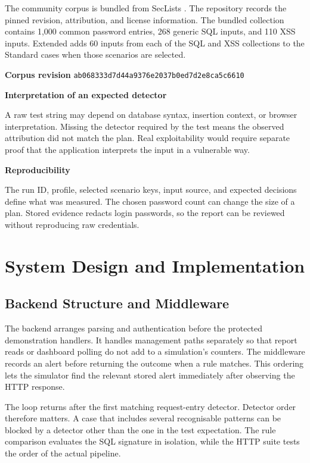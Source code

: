 \documentclass[11pt,a4paper,oneside]{report}
\newcommand{\topic}[1]{\smallskip\noindent\textbf{#1}\par\nobreak\vspace{-.39em}}
\begin{document}
The community corpus is bundled from SecLists \cite{seclists}. The repository records the pinned revision, attribution, and license information. The bundled collection contains 1,000 common password entries, 268 generic SQL inputs, and 110 XSS inputs. Extended adds 60 inputs from each of the SQL and XSS collections to the Standard cases when those scenarios are selected.

\textbf{Corpus revision} \texttt{ab068333d7d44a9376e2037b0ed7d2e8ca5c6610}

\topic{Interpretation of an expected detector}
A raw test string may depend on database syntax, insertion context, or browser interpretation. Missing the detector required by the test means the observed attribution did not match the plan. Real exploitability would require separate proof that the application interprets the input in a vulnerable way.

\topic{Reproducibility}
The run ID, profile, selected scenario keys, input source, and expected decisions define what was measured. The chosen password count can change the size of a plan. Stored evidence redacts login passwords, so the report can be reviewed without reproducing raw credentials.

\chapter{System Design and Implementation}
\section{Backend Structure and Middleware}
The backend arranges parsing and authentication before the protected demonstration handlers. It handles management paths separately so that report reads or dashboard polling do not add to a simulation's counters. The middleware records an alert before returning the outcome when a rule matches. This ordering lets the simulator find the relevant stored alert immediately after observing the HTTP response.



The loop returns after the first matching request-entry detector. Detector order therefore matters. A case that includes several recognisable patterns can be blocked by a detector other than the one in the test expectation. The rule comparison evaluates the SQL signature in isolation, while the HTTP suite tests the order of the actual pipeline.
\end{document}
